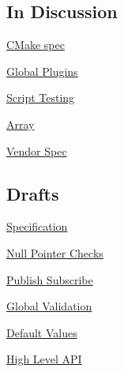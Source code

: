 \subsection*{In Discussion}


\begin{DoxyItemize}
\item \hyperlink{doc_decisions_cmake_spec_md}{C\+Make spec}
\item \hyperlink{doc_decisions_global_plugins_md}{Global Plugins}
\item \hyperlink{doc_decisions_script_testing_md}{Script Testing}
\item \hyperlink{doc_decisions_array_md}{Array}
\item \hyperlink{doc_decisions_vendor_spec_md}{Vendor Spec}
\end{DoxyItemize}

\subsection*{Drafts}


\begin{DoxyItemize}
\item \hyperlink{doc_decisions_specification_md}{Specification}
\item \hyperlink{doc_decisions_null_pointer_checks_md}{Null Pointer Checks}
\item \hyperlink{doc_decisions_pubsub_md}{Publish Subscribe}
\item \hyperlink{doc_decisions_global_validation_md}{Global Validation}
\item \hyperlink{doc_decisions_default_values_md}{Default Values}
\item \hyperlink{doc_decisions_high_level_api_md}{High Level A\+PI} 
\end{DoxyItemize}